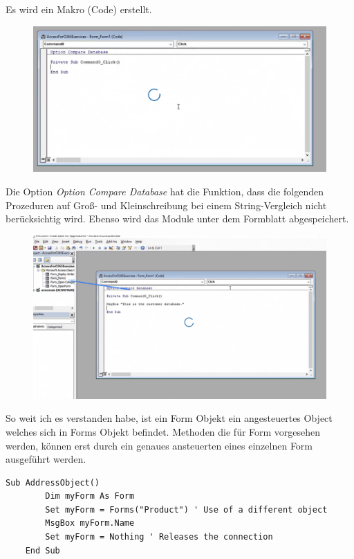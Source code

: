 Es wird ein Makro (Code) erstellt. 
\begin{figure}[H]
	\centering
	\includegraphics[scale = 0.3]{attachment/chapter_2/Scc024}
	\caption{}
	\label{fig:Scc024}
\end{figure} 
Die Option \textit{Option Compare Database} hat die Funktion, dass die folgenden Prozeduren auf Groß- und Kleinschreibung bei einem String-Vergleich nicht berücksichtig wird. Ebenso wird das Module unter dem Formblatt abgespeichert.

\begin{figure}[H]
	\centering
	\includegraphics[scale = 0.3]{attachment/chapter_2/Scc025}
	\caption{}
	\label{fig:Scc025}
\end{figure} 

So weit ich es verstanden habe, ist ein Form Objekt ein angesteuertes Object welches sich in Forms Objekt befindet. Methoden die für Form vorgesehen werden, können erst durch ein genaues ansteuerten eines einzelnen Form ausgeführt werden. 
\begin{lstlisting}[style=VBA]
	Sub AddressObject()
		Dim myForm As Form
		Set myForm = Forms("Product") ' Use of a different object
		MsgBox myForm.Name
		Set myForm = Nothing ' Releases the connection
	End Sub
\end{lstlisting}


